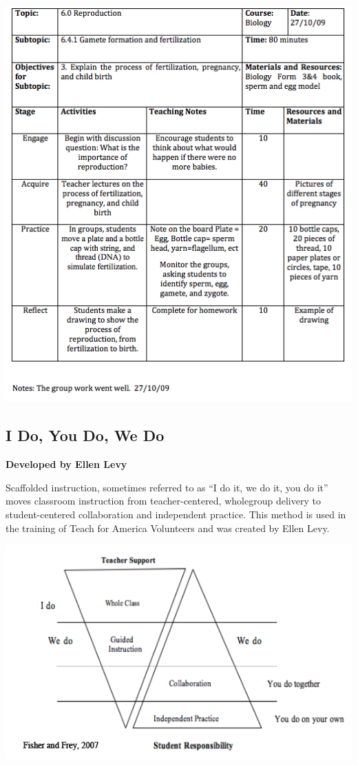 \begin{center}
\includegraphics[scale=.8]{./img/picture-5.png} 
\end{center}

\newpage
\begin{center}
\section{I Do, You Do, We Do}
\textbf{Developed by Ellen Levy}\\
\end{center}

Scaffolded instruction, sometimes referred to as ``I do it, we do it, you do it'' moves classroom instruction from teacher-centered, wholegroup delivery to student-centered collaboration and independent practice.  This method is used in the training of Teach for America Volunteers and was created by Ellen Levy. \\

\begin{center}
\includegraphics[scale=.5]{./img/i-do-you-do-triangle.png} 
\end{center}

